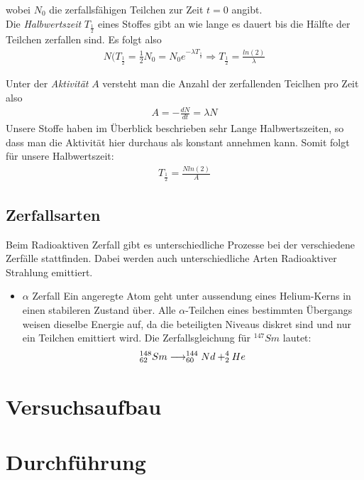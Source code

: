 \documentclass[12pt]{article}
\begin{document}
wobei $N_0$ die zerfallsfähigen Teilchen zur Zeit $t=0$ angibt.\\
Die \textit{Halbwertszeit} $T_{\frac{1}{2}}$ eines Stoffes gibt an wie lange es dauert bis die Hälfte der Teilchen zerfallen sind. Es folgt also
\begin{align}
N(T_{\frac{1}{2}} = \frac{1}{2} N_0 = N_0 e^{ -\lambda T_{\frac{1}{2}}} \Rightarrow T_{\frac{1}{2}} = \frac{ln(2)}{\lambda}
\end{align}

Unter der \textit{Aktivität} $A$ versteht man die Anzahl der zerfallenden Teiclhen pro Zeit also 
\begin{align}
 A = -\frac{dN}{dt} = \lambda N
\end{align}
Unsere Stoffe haben im Überblick beschrieben sehr Lange Halbwertszeiten, so dass man die Aktivität hier durchaus als konstant annehmen kann. Somit folgt für unsere Halbwertszeit:
\begin{align}
 T_{\frac{1}{2}} = \frac{N ln(2)}{A}
\end{align}

\subsection{Zerfallsarten}

Beim Radioaktiven Zerfall gibt es unterschiedliche Prozesse bei der verschiedene Zerfälle stattfinden. Dabei werden auch unterschiedliche Arten Radioaktiver Strahlung emittiert.

\begin{itemize}
 \item $\alpha$ Zerfall
Ein angeregte Atom geht unter aussendung eines Helium-Kerns in einen stabileren Zustand über. Alle $\alpha$-Teilchen eines bestimmten Übergangs weisen dieselbe Energie auf, da die beteiligten Niveaus diskret sind und nur ein Teilchen emittiert wird. Die Zerfallsgleichung für $^{147}Sm$ lautet:
\begin{align}
 \notag ^{148}_{62}Sm \longrightarrow ^{144}_{60}Nd + ^4_2He
\end{align}


\end{itemize}


\section{Versuchsaufbau}

\section{Durchführung}
\end{document}
